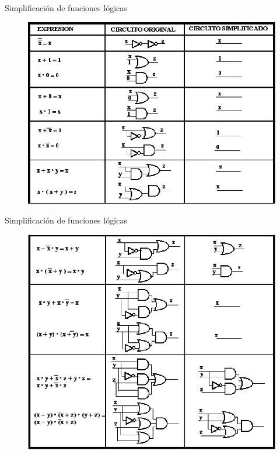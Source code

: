 \documentclass[aspectratio=169]{beamer}
\begin{document}
\begin{frame}{Simplificación de funciones lógicas}
    \begin{figure}
        \includegraphics[scale=.3]{fig/cir_1.png}
    \end{figure}
\end{frame}

\begin{frame}{Simplificación de funciones lógicas}
    \begin{figure}
        \includegraphics[scale=.28]{fig/cir_2.png}
    \end{figure}
\end{frame}
\end{document}
